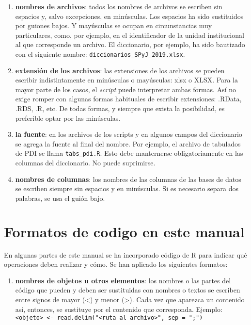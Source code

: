 \documentclass[
  spanish,
]{book}
\providecommand{\tightlist}{%
  \setlength{\itemsep}{0pt}\setlength{\parskip}{0pt}}
\begin{document}
\begin{enumerate}
\def\labelenumi{\alph{enumi})}
\item
  \textbf{nombres de archivos}: todos los nombres de archivos se escriben sin espacios y, salvo excepciones, en minúsculas. Los espacios ha sido sustituidos por guiones bajos. Y mayúsculas se ocupan en circunstancias muy particulares, como, por ejemplo, en el identificador de la unidad institucional al que corresponde un archivo. El diccionario, por ejemplo, ha sido bautizado con el siguiente nombre: \texttt{diccionarios\_SPyJ\_2019.xlsx}.
\item
  \textbf{extensión de los archivos}: las extensiones de los archivos se pueden escribir indistintamente en minúsculas o mayúsculas: xlsx o XLSX. Para la mayor parte de los casos, el \emph{script} puede interpretar ambas formas. Así no exige romper con algunas formas habituales de escribir extensiones: .RData, .RDS, .R, etc. De todas formas, y siempre que exista la posibilidad, es preferible optar por las minúsculas.
\item
  \textbf{la fuente}: en los archivos de los scripts y en algunos campos del diccionario se agrega la fuente al final del nombre. Por ejemplo, el archivo de tabulados de PDI se llama \texttt{tabs\_pdi.R}. Esto debe manternerse obligatoriamente en las columnas del diccionario. No puede suprimirse.
\item
  \textbf{nombres de columnas}: los nombres de las columnas de las bases de datos se escriben siempre sin espacios y en minúsculas. Si es necesario separa dos palabras, se usa el guión bajo.
\end{enumerate}

\hypertarget{formatos-de-codigo-en-este-manual}{%
\section{Formatos de codigo en este manual}\label{formatos-de-codigo-en-este-manual}}

En algunas partes de este manual se ha incorporado código de R para indicar qué operaciones deben realizar y cómo. Se han aplicado los siguientes formatos:

\begin{enumerate}
\def\labelenumi{\alph{enumi})}
\tightlist
\item
  \textbf{nombres de objetos u otros elementos}: los nombres o las partes del código que pueden y deben ser sustituidas con nombres o textos se escriben entre signos de mayor (\textless) y menor (\textgreater). Cada vez que aparezca un contenido así, entonces, se sustituye por el contenido que corresponda. Ejemplo: \texttt{\textless{}objeto\textgreater{}\ \textless{}-\ read.delim("\textless{}ruta\ al\ archivo\textgreater{}",\ sep\ =\ ";")}
\end{enumerate}
\end{document}
